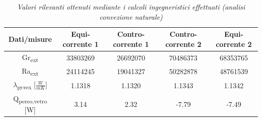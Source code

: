 \documentclass[a4paper,10pt]{article}                                                                                       %
\begin{document}
\begin{table}[H]                                                                                                            %
  \caption{\textit{Valori rilevanti ottenuti mediante i calcoli ingegneristici effettuati (analisi convezione naturale)}}   %
  \label{tab:nat_conv_calcs}                                                                                                %
  \vspace{3mm}                                                                                                              %
  \centering                                                                                                                %
  \begin{tabular}{||c|c|c|c|c||}                                                                                            %
    \hline
    Dati/misure                                     & Equi-corrente 1 & Contro-corrente 1 & Contro-corrente 2 & Equi-corrente 2 \\
    \hline\hline
    Gr\textsubscript{ext}                           & 33803269        & 26692070          & 70486373          & 68353765        \\  
    Ra\textsubscript{ext}                           & 24114245        & 19041327          & 50282878          & 48761539        \\
    $\lambda$\textsubscript{pyrex} [$\frac{W}{mK}$] & 1.1318          & 1.1320            & 1.1343            & 1.1342          \\
    Q\textsubscript{perso,vetro} [W]                & 3.14            & 2.32              & -7.79             & -7.49           \\
    \hline
  \end{tabular}                                                                                                             %
\end{table}                                                                                                                 %
\end{document}
